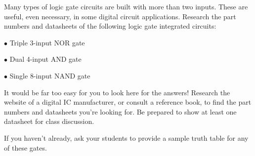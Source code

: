 

Many types of logic gate circuits are built with more than two inputs.  These are useful, even necessary, in some digital circuit applications.  Research the part numbers and datasheets of the following logic gate integrated circuits:

\medskip
\item{$\bullet$} Triple 3-input NOR gate
\item{$\bullet$} Dual 4-input AND gate
\item{$\bullet$} Single 8-input NAND gate
\medskip







It would be far too easy for you to look here for the answers!  Research the website of a digital IC manufacturer, or consult a reference book, to find the part numbers and datasheets you're looking for.  Be prepared to show at least one datasheet for class discussion.







If you haven't already, ask your students to provide a sample truth table for any of these gates.




